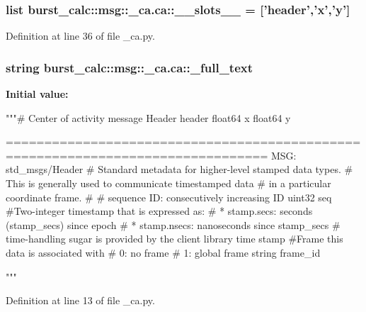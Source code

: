 \subsubsection[{\-\_\-\-\_\-slots\-\_\-\-\_\-}]{\setlength{\rightskip}{0pt plus 5cm}list {\bf burst\-\_\-calc\-::msg\-::\-\_\-ca.\-ca\-::\-\_\-\-\_\-slots\-\_\-\-\_\-} = ['{\bf header}','{\bf x}','{\bf y}']\hspace{0.3cm}{\ttfamily  [static, private]}}\label{classburst__calc_1_1msg_1_1__ca_1_1ca_a21332cf43748d49518a42a15069d596c}


\-Definition at line 36 of file \-\_\-ca.\-py.

\subsubsection[{\-\_\-full\-\_\-text}]{\setlength{\rightskip}{0pt plus 5cm}string {\bf burst\-\_\-calc\-::msg\-::\-\_\-ca.\-ca\-::\-\_\-full\-\_\-text}\hspace{0.3cm}{\ttfamily  [static, private]}}\label{classburst__calc_1_1msg_1_1__ca_1_1ca_a02b10b267fc05b1e142d40113f732300}
{\bfseries \-Initial value\-:}
\begin{DoxyCode}
"""# Center of activity message
Header header
float64 x
float64 y 

      ================================================================================
MSG: std_msgs/Header
# Standard metadata for higher-level stamped data types.
# This is generally used to communicate timestamped data 
# in a particular coordinate frame.
# 
# sequence ID: consecutively increasing ID 
uint32 seq
#Two-integer timestamp that is expressed as:
# * stamp.secs: seconds (stamp_secs) since epoch
# * stamp.nsecs: nanoseconds since stamp_secs
# time-handling sugar is provided by the client library
time stamp
#Frame this data is associated with
# 0: no frame
# 1: global frame
string frame_id

"""
\end{DoxyCode}


\-Definition at line 13 of file \-\_\-ca.\-py.

